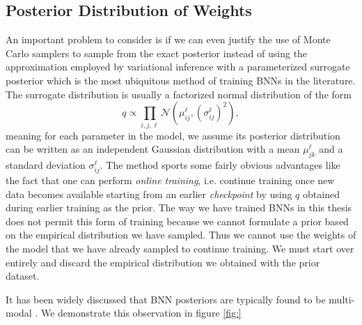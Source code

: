 \subsection{Posterior Distribution of Weights}
An important problem to consider is if we can even justify the use of Monte Carlo samplers to sample from the exact posterior instead of using the approximation employed by variational inference with a parameterized surrogate posterior which is the most ubiquitous method of training BNNs in the literature. The surrogate distribution is usually a factorized normal distribution of the form
\begin{equation}
    q \propto \prod_{i, j, \ell} \mathcal{N}(\mu_{ij}^\ell, (\sigma_{ij}^\ell)^2),
\end{equation}
meaning for each parameter in the model, we assume its posterior distribution can be written as an independent Gaussian distribution with a mean $\mu_{jk}^\ell$ and a standard deviation $\sigma_{ij}^\ell$. The method sports some fairly obvious advantages like the fact that one can perform \textit{online training}, i.e. continue training once new data becomes available starting from an earlier \textit{checkpoint} by using $q$ obtained during earlier training as the prior. The way we have trained BNNs in this thesis does not permit this form of training because we cannot formulate a prior based on the empirical distribution we have sampled. Thus we cannot use the weights of the model that we have already sampled to continue training. We must start over entirely and discard the empirical distribution we obtained with the prior dataset. 

It has been widely discussed that BNN posteriors are typically found to be multi-modal \cite{google_bnn_posteriors}. We demonstrate this observation in figure \ref{fig:}


